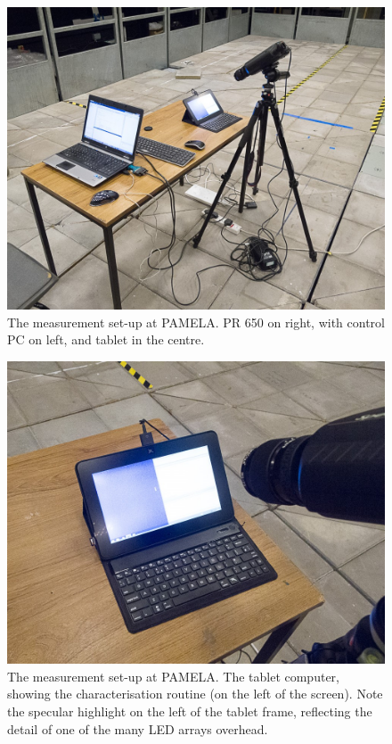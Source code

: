\begin{figure}[hbtp]
\includegraphics[max width=\textwidth]{figs/tablet/pamela_pr6501.jpg}
\caption{The measurement set-up at \gls{PAMELA}. PR 650 on right, with control PC on left, and tablet in the centre.}
\label{fig:pr6501}
\end{figure}

\begin{figure}[hbtp]
\includegraphics[max width=\textwidth]{figs/tablet/pamela_pr6502.jpg}
\caption{The measurement set-up at \gls{PAMELA}. The tablet computer, showing the characterisation routine (on the left of the screen). Note the specular highlight on the left of the tablet frame, reflecting the detail of one of the many \gls{LED} arrays overhead.}
\label{fig:pr6502}
\end{figure}

